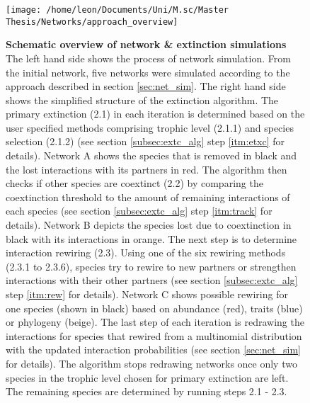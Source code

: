 \documentclass[12pt,a4paper]{article}
\begin{document}
	\begin{figure}[H]
	 \texttt{[image: /home/leon/Documents/Uni/M.sc/Master Thesis/Networks/approach\_overview]}
	 \caption[Schematic overview of network \& extinction simulations]{\textbf{Schematic overview of network \& extinction simulations} The left hand side shows the process of network simulation. From the initial network, five networks were simulated according to the approach described in section \ref{sec:net_sim}. The right hand side shows the simplified structure of the extinction algorithm. The primary extinction (2.1) in each iteration is determined based on the user specified methods comprising trophic level (2.1.1) and species selection (2.1.2) (see section \ref{subsec:extc_alg} step \ref{itm:etxc} for details). Network A shows the species that is removed in black and the lost interactions with its partners in red. The algorithm then checks if other species are coextinct (2.2) by comparing the coextinction threshold to the amount of remaining interactions of each species (see section \ref{subsec:extc_alg} step \ref{itm:track} for details). Network B depicts the species lost due to coextinction in black with its interactions in orange. The next step is to determine interaction rewiring (2.3). Using one of the six rewiring methods (2.3.1 to 2.3.6), species try to rewire to new partners or strengthen interactions with their other partners (see section \ref{subsec:extc_alg} step \ref{itm:rew} for details). Network C shows possible rewiring for one species (shown in black) based on abundance (red), traits (blue) or phylogeny (beige).
	 The last step of each iteration is redrawing the interactions for species that rewired from a multinomial distribution with the updated interaction probabilities (see section \ref{sec:net_sim} for details). The algorithm stops redrawing networks once only two species in the trophic level chosen for primary extinction are left. The remaining species are determined by running steps 2.1 - 2.3.}
	 \label{fig:extc_alg}
\end{figure}
		\par


\end{document}
